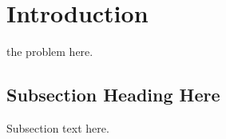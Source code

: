 \documentclass[journal]{IEEEtran}
\begin{document}




\maketitle


\begin{abstract}
The abstract goes here.
\end{abstract}








%
\IEEEpeerreviewmaketitle



\section{Introduction}
% 
% 
% 
% 
 the problem here.

\subsection{Subsection Heading Here}
Subsection text here.
\end{document}
